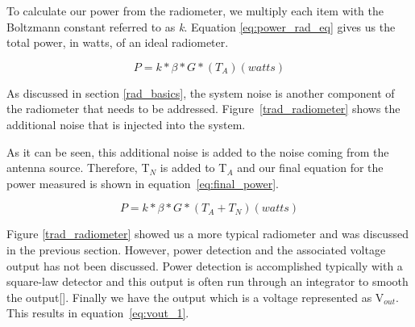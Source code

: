 


To calculate our power from the radiometer, we multiply each item with the Boltzmann constant referred to as \textit{k}. Equation \ref{eq:power_rad_eq} gives us the total power, in watts, of an ideal radiometer.

\begin{equation} \label{eq:power_rad_eq}
P=k*\beta*G*(T_{A}) (watts)
\end{equation}

As discussed in section \ref{rad_basics}, the system noise is another component of the radiometer that needs to be addressed.  Figure~\ref{trad_radiometer} shows the additional noise that is injected into the system.


As it can be seen, this additional noise is added to the noise coming from the antenna source.  Therefore, T$_{N}$ is added to T$_{A}$ and our final equation for the power measured is shown in equation~\ref{eq:final_power}.  

\begin{equation} \label{eq:final_power}
P=k*\beta*G*(T_{A}+T_{N}) (watts)
\end{equation}

Figure \ref{trad_radiometer} showed us a more typical radiometer and was discussed in the previous section.  However, power detection and the associated voltage output has not been discussed.  Power detection is accomplished typically with a square-law detector and this output is often run through an integrator to smooth the output[\cite{Leinweber}].  Finally we have the output which is a voltage represented as V$_{out}$.  This results in equation~\ref{eq:vout_1}.

